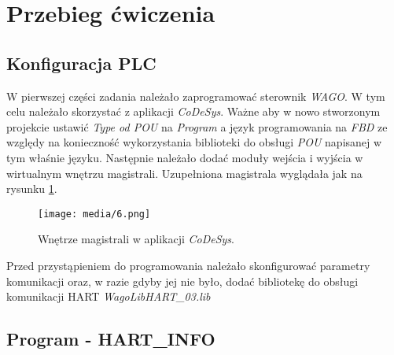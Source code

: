 \documentclass{article}
\begin{document}
\section{Przebieg ćwiczenia}

\subsection{Konfiguracja PLC}
W pierwszej części zadania należało zaprogramować sterownik \textit{WAGO}. W tym celu należało skorzystać z aplikacji \textit{CoDeSys}. Ważne aby w nowo stworzonym projekcie ustawić \textit{Type od POU} na \textit{Program} a język programowania na \textit{FBD} ze względy na konieczność wykorzystania biblioteki do obsługi \textit{POU} napisanej w tym właśnie języku. Następnie należało dodać moduły wejścia i wyjścia w wirtualnym wnętrzu magistrali. Uzupełniona magistrala wyglądała jak na rysunku \ref{fig1}.

\vspace{1em}
\begin{figure}[ht]
    \centering
    \texttt{[image: media/6.png]}
    \caption{Wnętrze magistrali w aplikacji \textit{CoDeSys}.}
    \label{fig1}
\end{figure}

Przed przystąpieniem do programowania należało skonfigurować parametry komunikacji oraz, w razie gdyby jej nie było, dodać bibliotekę do obsługi komunikacji HART \textit{WagoLibHART\_03.lib}
\newpage


\subsection{Program - HART\_INFO} \label{1a}
\end{document}
